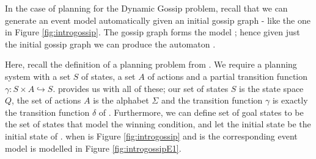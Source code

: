 \documentclass[10pt, a4paper]{report}
\begin{document}
In the case of planning for the Dynamic Gossip problem, recall that we can
generate an event model  automatically given an initial gossip graph -
like the one in Figure \ref{fig:introgossip}. The gossip graph forms the model
; hence given just the initial gossip graph we can produce the automaton
\mestar.

Here, recall the definition of a planning problem from . We
require a planning system with a set $S$ of states, a set $A$ of actions and a
partial transition function $\gamma : S \times A \hookrightarrow S$. \mestar
provides us with all of these; our set of states $S$ is the state space $Q$, the
set of actions $A$ is the alphabet $\Sigma$ and the transition function $\gamma$
is exactly the transition function $\delta$ of \mestar. Furthermore, we can
define set of goal states to be the set of states that model the winning
condition, and let the initial state be the initial state of \mestar. \mestar
when  is Figure \ref{fig:introgossip} and  is the corresponding
event model is modelled in Figure \ref{fig:introgossipE1}.
\end{document}
